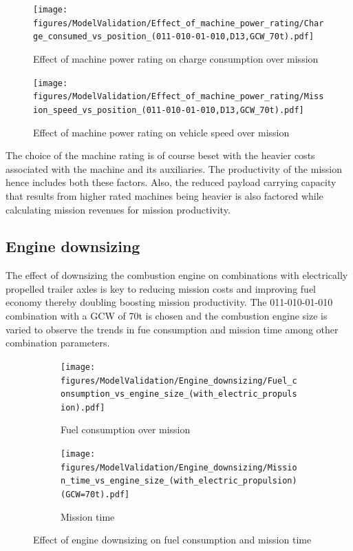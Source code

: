 \documentclass[ExampleMasters.tex]{subfiles}
\begin{document}
\begin{figure}[h!]
\centering
\texttt{[image: figures/ModelValidation/Effect\_of\_machine\_power\_rating/Charge\_consumed\_vs\_position\_(011-010-01-010,D13,GCW\_70t).pdf]}
\caption{Effect of machine power rating on charge consumption over mission}
\label{chargeMissionMachineRating}
\end{figure}

\begin{figure}[h!]
\centering
\texttt{[image: figures/ModelValidation/Effect\_of\_machine\_power\_rating/Mission\_speed\_vs\_position\_(011-010-01-010,D13,GCW\_70t).pdf]}
\caption{Effect of machine power rating on vehicle speed over mission}
\label{speedMissionMachineRating}
\end{figure}

The choice of the machine rating is of course beset with the heavier costs associated with the machine and its auxiliaries. The productivity of the mission hence includes both these factors. Also, the reduced payload carrying capacity that results from higher rated machines being heavier is also factored while calculating mission revenues for mission productivity.\\

\subsection{Engine downsizing}

The effect of downsizing the combustion engine on combinations with electrically propelled trailer axles is key to reducing mission costs and improving fuel economy thereby doubling boosting mission productivity. The 011-010-01-010 combination with a GCW of 70t is chosen and the combustion engine size is varied to observe the trends in fue consumption and mission time among other combination parameters.\\

\begin{figure}[h!]
\begin{subfigure}{.5\textwidth}
	\centering
	\texttt{[image: figures/ModelValidation/Engine\_downsizing/Fuel\_consumption\_vs\_engine\_size\_(with\_electric\_propulsion).pdf]}
	\caption{Fuel consumption over mission}
\end{subfigure}
\begin{subfigure}{.5\textwidth}
	\centering
	\texttt{[image: figures/ModelValidation/Engine\_downsizing/Mission\_time\_vs\_engine\_size\_(with\_electric\_propulsion)(GCW=70t).pdf]}
	\caption{Mission time}
\end{subfigure}
\caption{Effect of engine downsizing on fuel consumption and mission time}
\label{fuelTimeEngineDownsize}
\end{figure}
\end{document}
